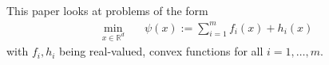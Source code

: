 \documentclass[12pt,a4paper,twoside]{article}
\theoremstyle{plain}
\newtheorem{lem}[thm]{Lemma}
\theoremstyle{note}
\numberwithin{thm}{section}
\newcommand{\prox}[2]{\text{Prox}_{#1}\left(#2\right)}
\let\temp\phi
\let\phi\varphi
\let\varphi\temp
\let\epsilon\varepsilon
\begin{document}
%	

	\subsection{\cite{Bertsekas2011}}
	This paper looks at problems of the form 
		\begin{align*}
	\min_{x \in \mathbb{R}^d}\quad &{\psi(x) := \sum_{i=1}^{m}f_i(x) + h_i(x)}
	\end{align*}
	with $f_i, h_i$ being real-valued, convex functions for all $i=1,\dots,m$.
	
\end{document}
